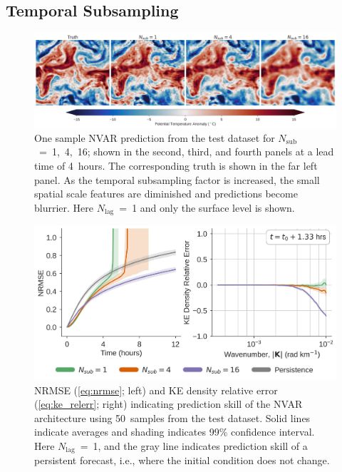 \documentclass[draft]{agujournal2019}
\newcommand{\maxlag}{N_\text{lag}}
\newcommand{\nsub}{N_\text{sub}}
\newcommand{\nlag}{\maxlag}
\begin{document}
\subsection{Temporal Subsampling}
\label{subsec:nvar-subsampling}


\begin{figure}
    \centering
    \includegraphics[width=\textwidth]{nvar_4hr_snap.jpg}
    \caption{One sample NVAR prediction from the test dataset for
        $\nsub$~=~1,~4,~16;
        shown in the second, third, and fourth panels at a lead time of 4~hours.
        The corresponding truth is shown in the far left panel.
        As the temporal subsampling factor is increased,
        the small spatial scale features are diminished and predictions become
        blurrier.
        Here $\maxlag$~=~1 and only the surface level is shown.
    }
    \label{fig:nvar_qualitative}
\end{figure}

\begin{figure}
    \centering
    \includegraphics[width=.8\textwidth]{nvar-nrmse-and-kere.jpg}
    \caption{NRMSE (\cref{eq:nrmse}; left) and KE density
        relative error (\cref{eq:ke_relerr}; right)
        indicating prediction skill of the NVAR
        architecture using 50~samples from the test dataset.
        Solid lines indicate averages and shading indicates 99\% confidence
        interval.
        Here $\nlag$~=~1, and the gray line indicates prediction skill of a
        persistent forecast, i.e., where the initial condition does not change.
    }
    \label{fig:nvar_nrmse}
\end{figure}
\end{document}

